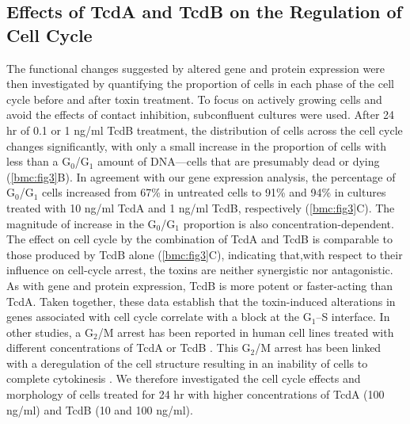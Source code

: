 \subsection{Effects of TcdA and TcdB on the Regulation of Cell Cycle}

The functional changes suggested by altered gene and protein 
expression were then investigated by quantifying the proportion 
of cells in each phase of the cell cycle before and after 
toxin treatment. To focus on actively growing cells and 
avoid the effects of contact inhibition, subconfluent 
cultures were used. After 24 hr of 0.1 or 1 ng/ml TcdB 
treatment, the distribution of cells across the cell 
cycle changes significantly, with only a small increase 
in the proportion of cells with less than a 
G$_{\text{0}}$/G$_{\text{1}}$ amount of DNA—cells 
that are presumably dead or dying (\autoref{bmc:fig3}B). 
In agreement with our gene expression analysis, the 
percentage of G$_{\text{0}}$/G$_{\text{1}}$ cells increased 
from 67\% in untreated cells to 91\% and 94\% in cultures 
treated with 10 ng/ml TcdA and 1 ng/ml TcdB, 
respectively (\autoref{bmc:fig3}C). The magnitude of 
increase in the G$_{\text{0}}$/G$_{\text{1}}$ proportion 
is also concentration-dependent. The effect on cell cycle 
by the combination of TcdA and TcdB is comparable to 
those produced by TcdB alone (\autoref{bmc:fig3}C), 
indicating that,with respect to their influence on cell-cycle 
arrest, the toxins are neither synergistic nor antagonistic. 
As with gene and protein expression, TcdB is more potent or 
faster-acting than TcdA. Taken together, these data 
establish that the toxin-induced alterations in genes 
associated with cell cycle correlate with a block at 
the G$_{\text{1}}$–S interface. In other studies, a 
G$_{\text{2}}$/M arrest has been reported in human cell 
lines treated with different concentrations of TcdA 
or TcdB \cite{Kim:2005jk, Gerhard:2008wz, Nottrott:2007ep}. 
This G$_{\text{2}}$/M arrest has been linked with a 
deregulation of the cell structure resulting in an 
inability of cells to complete cytokinesis 
\cite{Huelsenbeck:2009di}. We therefore investigated 
the cell cycle effects and morphology of cells treated 
for 24 hr with higher concentrations of TcdA (100 ng/ml) 
and TcdB (10 and 100 ng/ml).

